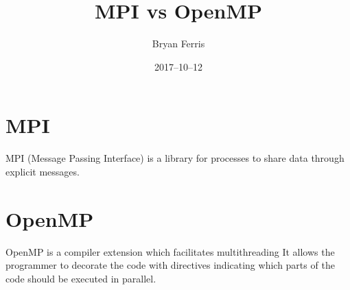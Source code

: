 \documentclass{standalone}
\title{MPI vs OpenMP}
\date{2017--10--12}
\author{Bryan Ferris}
\begin{document}
\ifstandalone
\maketitle
{}


\newpage
{}
\fi

\section{MPI}
MPI (Message Passing Interface) is a library for processes to share data through
explicit messages.

\section{OpenMP}
OpenMP is a compiler extension which facilitates multithreading It allows the
programmer to decorate the code with directives indicating which parts of the
code should be executed in parallel.
\end{document}
